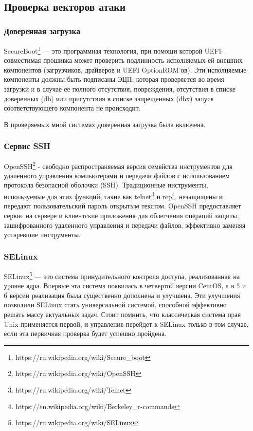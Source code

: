 \subsection{Проверка векторов атаки}

\subsubsection{Доверенная загрузка}

SecureBoot\footnote{https://ru.wikipedia.org/wiki/Secure\_boot} — это программная технология, при помощи которой UEFI-совместимая прошивка может проверить подлинность исполняемых ей внешних компонентов (загрузчиков, драйверов и UEFI OptionROM'ов). Эти исполняемые компоненты должны быть подписаны ЭЦП, которая проверяется во время загрузки и в случае ее полного отсутствия, повреждения, отсутствия в списке доверенных (db) или присутствия в списке запрещенных (dbx) запуск соответствующего компонента не происходит. 

В проверяемых мной системах доверенная загрузка была включена.

\subsubsection{Сервис SSH}

OpenSSH\footnote{https://ru.wikipedia.org/wiki/OpenSSH} - свободно распространяемая версия семейства инструментов для удаленного управления компьютерами и передачи файлов с использованием протокола безопасной оболочки (SSH). Традиционные инструменты, используемые для этих функций, такие как telnet\footnote{https://ru.wikipedia.org/wiki/Telnet} и rcp\footnote{https://en.wikipedia.org/wiki/Berkeley\_r-commands}, незащищены и передают пользовательский пароль открытым текстом. OpenSSH предоставляет сервис на сервере и клиентские приложения для облегчения операций защиты, зашифрованного удаленного управления и передачи файлов, эффективно заменяя устаревшие инструменты.

\subsubsection{SELinux}

SELinux\footnote{https://ru.wikipedia.org/wiki/SELinux} — это система принудительного контроля доступа, реализованная на уровне ядра. Впервые эта система появилась в четвертой версии CentOS, а в 5 и 6 версии реализация была существенно дополнена и улучшена. Эти улучшения позволили SELinux стать универсальной системой, способной эффективно решать массу актуальных задач. Стоит помнить, что классическая система прав Unix применяется первой, и управление перейдет к SELinux только в том случае, если эта первичная проверка будет успешно пройдена.




